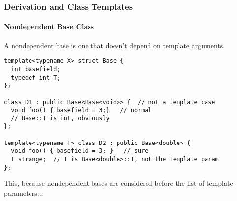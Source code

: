 \begin{frame}[fragile,t]
\frametitle{Derivation and Class Templates}
\framesubtitle{Nondependent Base Class}
A nondependent base is one that doesn't depend on template arguments.
{\scriptsize
\begin{verbatim}
template<typename X> struct Base {
  int basefield;
  typedef int T;
};

class D1 : public Base<Base<void>> {  // not a template case
  void foo() { basefield = 3;}   // normal
  // Base::T is int, obviously
};

template<typename T> class D2 : public Base<double> {
  void foo() { basefield = 3; }   // sure
  T strange;  // T is Base<double>::T, not the template param
};

\end{verbatim}
}

This, because nondependent bases are considered before the list of
template parameters...

\end{frame}


